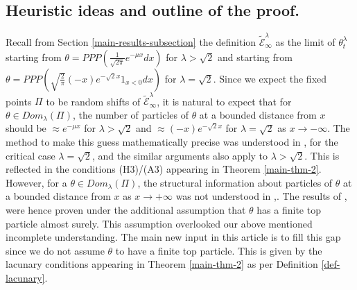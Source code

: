 \documentclass[a4paper,reqno]{amsart}%
\newcommand{\1}{\mathbf 1}
\theoremstyle{mine}
\numberwithin{theorem}{section}
\numberwithin{equation}{section}
\theoremstyle{remark}
\begin{document}
\subsection{Heuristic ideas and outline of the proof.}

Recall from Section \ref{main-results-subsection} the definition $\widetilde{\mathcal E}_\infty^\lambda$ as the limit of $\theta_t^\lambda$ starting from 
$\theta = PPP(\frac{1}{\sqrt{2\pi}}e^{-\mu x } dx)$ for $\lambda > \sqrt{2}$ and starting from $\theta = PPP(\sqrt{\frac{2}{\pi}}(-x)e^{-\sqrt{2}x}1_{x < 0} dx)$ for $\lambda=\sqrt 2$. Since we expect the fixed points $\Pi$ to be random shifts of $\widetilde{\mathcal E}_\infty^\lambda$, it is natural to expect that for $\theta \in Dom_{\lambda}(\Pi)$, the number of particles of $\theta$ at a bounded distance from $x$ should be $\approx e^{-\mu x }$ for $\lambda >\sqrt{2}$ and $\approx (-x)e^{-\sqrt{2}x}$ for $\lambda = \sqrt{2}$ as $x\rightarrow -\infty$. The method to make this guess mathematically precise was understood in \cite{Shekhar_FP}, \cite{Shekhar_Domain} for the critical case $\lambda = \sqrt{2}$, and the similar arguments also apply to $\lambda >\sqrt{2}$. This is reflected in the conditions (H3)/(A3) appearing in Theorem \ref{main-thm-2}. 
However, for a $\theta \in Dom_{\lambda}(\Pi)$, the structural information about particles of $\theta$ at a bounded distance from $x$ as $x \to +\infty$ was not understood in \cite{Shekhar_FP},\cite{Shekhar_Domain}. 
The results of \cite{Shekhar_FP}, \cite{Shekhar_Domain} were hence proven under the additional assumption that $\theta$ has a finite top particle almost surely. This assumption overlooked our above mentioned incomplete understanding. The main new input in this article is to fill this gap since we do not assume $\theta$ to have a finite top particle. This is given by the lacunary conditions appearing in Theorem \ref{main-thm-2} as per Definition \ref{def-lacunary}. \\      
\end{document}
